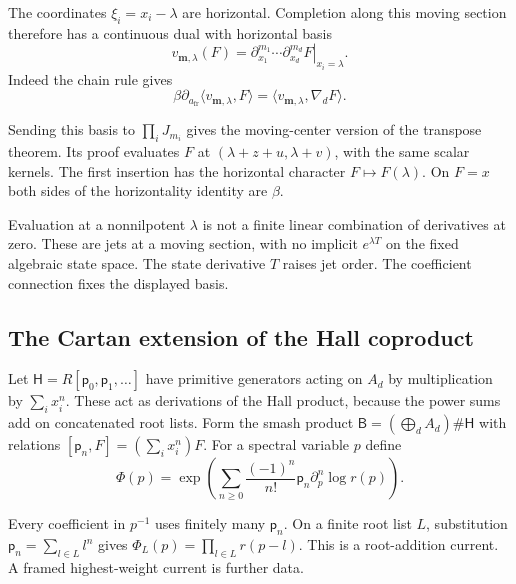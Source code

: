 The coordinates $\xi_i=x_i-\lambda$ are horizontal.
Completion along this moving section therefore has a
continuous dual with horizontal basis
\[
 v_{\mathbf m,\lambda}(F)
 =\left.\partial_{x_1}^{m_1}\cdots\partial_{x_d}^{m_d}
                         F\right|_{x_i=\lambda}.
\]
Indeed the chain rule gives
\[
 \beta\partial_{a_{\mathrm{fr}}}\langle v_{\mathbf m,\lambda},F\rangle
       =\langle v_{\mathbf m,\lambda},\nabla_dF\rangle .
\]

Sending this basis to $\prod_iJ_{m_i}$ gives the moving-center
version of the transpose theorem. Its proof evaluates $F$
at $(\lambda+z+u,\lambda+v)$, with the same scalar kernels.
The first insertion has the horizontal character
$F\mapsto F(\lambda)$. On $F=x$ both sides of the
horizontality identity are $\beta$.

Evaluation at a nonnilpotent $\lambda$ is not a finite
linear combination of derivatives at zero. These are jets
at a moving section, with no implicit $e^{\lambda T}$ on
the fixed algebraic state space. The state derivative $T$
raises jet order. The coefficient connection fixes the
displayed basis.

\subsection{The Cartan extension of the Hall coproduct}

Let $\mathsf H=R[\mathsf p_0,\mathsf p_1,\ldots]$ have
primitive generators acting on $A_d$ by multiplication
by $\sum_i x_i^n$. These act as derivations of the Hall
product, because the power sums add on concatenated root
lists. Form the smash product
$\mathsf B=(\bigoplus_dA_d)\#\mathsf H$ with relations
$[\mathsf p_n,F]=(\sum_i x_i^n)F$.
For a spectral variable $p$ define
\begin{equation}\label{v4-arith:curve:eq:cartan-current}
 \Phi(p)=\exp\left(\sum_{n\geq0}
       \frac{(-1)^n}{n!}\mathsf p_n\partial_p^n\log r(p)\right).
\end{equation}

Every coefficient in $p^{-1}$ uses finitely many
$\mathsf p_n$. On a finite root list $L$, substitution
$\mathsf p_n=\sum_{l\in L}l^n$ gives
$\Phi_L(p)=\prod_{l\in L}r(p-l)$.
This is a root-addition current. A framed highest-weight
current is further data.

